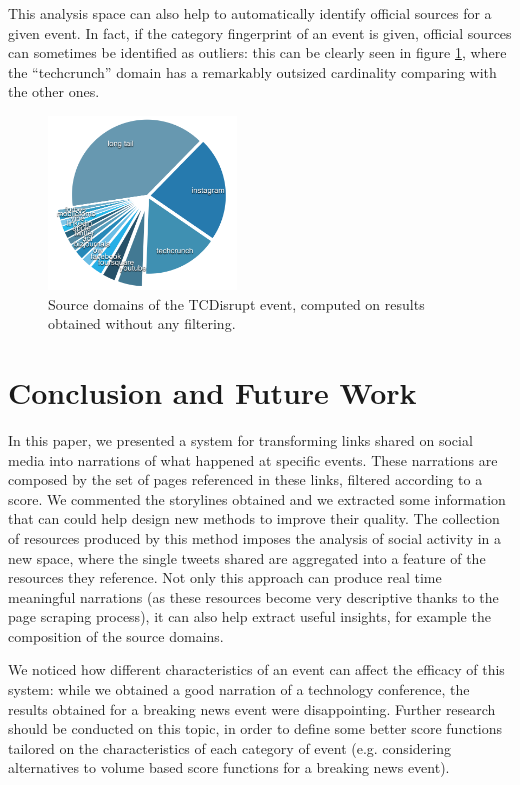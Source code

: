 \documentclass{sig-alternate}
\begin{document}
This analysis space can also help to automatically identify official sources for a given event. In fact, if the category fingerprint of an event is given, official sources can sometimes be identified as outliers: this can be clearly seen in figure \ref{fig:tcdisrupt_outlier}, where the ``techcrunch'' domain has a remarkably outsized cardinality comparing with the other ones.
\begin{figure}[htbp]
  \centering
  \includegraphics[width=5cm]{Figures/tcdisrupt_outlier.png}
  \caption{Source domains of the TCDisrupt event, computed on results obtained without any filtering.}
  \label{fig:tcdisrupt_outlier}
\end{figure}

\section{Conclusion and Future Work}
\label{sec:conclusions}
In this paper, we presented a system for transforming links shared on social media into narrations of what happened at specific events. These narrations are composed by the set of pages referenced in these links, filtered according to a score. We commented the storylines obtained and we extracted some information that can could help design new methods to improve their quality. The collection of resources produced by this method imposes the analysis of social activity in a new space, where the single tweets shared are aggregated into a feature of the resources they reference. Not only this approach can produce real time meaningful narrations (as these resources become very descriptive thanks to the page scraping process), it can also help extract useful insights, for example the composition of the source domains.

We noticed how different characteristics of an event can affect the efficacy of this system: while we obtained a good narration of a technology conference, the results obtained for a breaking news event were disappointing. Further research should be conducted on this topic, in order to define some better score functions tailored on the characteristics of each category of event (e.g. considering alternatives to volume based score functions for a breaking news event).
\end{document}
